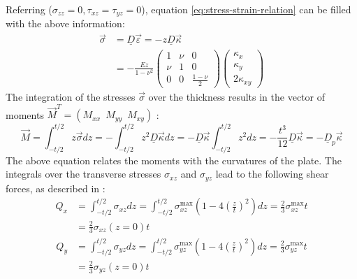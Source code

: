   Referring \cite{klein2013fem} ($\sigma_{zz} = 0, \tau_{xz} = \tau_{yz} = 0$), equation \eqref{eq:stress-strain-relation} can be filled with the above information:
  \begin{align}\label{eq:sigma=-z*D*kappa}
  \vec{\sigma} &= \underline{D} \vec{\varepsilon} = -z \underline{D} \vec{\kappa} \nonumber\\
               &= -\frac{E z}{1-\nu^2} \begin{pmatrix}
               1&\nu&0\\
               \nu&1&0\\
               0&0&\frac{1-\nu}{2}
               \end{pmatrix} \begin{pmatrix}
               \kappa_x\\\kappa_y\\2\kappa_{xy}
               \end{pmatrix}
  \end{align}
  The integration of the stresses $\vec{\sigma}$ over the thickness results in the vector of moments $\vec{M}^T = \left(M_{xx}\ \;M_{yy}\ \;M_{xy}\right)$ \cite{steinke2005finite}:
  \begin{equation}\label{eq:M=-Dp*kappa}
  \vec{M} = \int_{-t/2}^{t/2} z\vec{\sigma} dz = -\int_{-t/2}^{t/2} z^2 \underline{D} \vec{\kappa} dz = -\underline{D} \vec{\kappa} \int_{-t/2}^{t/2} z^2 dz = -\frac{t^3}{12} \underline{D} \vec{\kappa} = -\underline{D}_p \vec{\kappa}
  \end{equation}
  The above equation relates the moments with the curvatures of the plate. The integrals over the transverse stresses $\sigma_{xz}$ and $\sigma_{yz}$ lead to the following shear forces, as described in \cite{steinke2005finite}:
  \begin{align}
  Q_x &= \int_{-t/2}^{t/2}\sigma_{xz} dz = \int_{-t/2}^{t/2} \sigma_{xz}^{\max} \left(1-4\left(\frac{z}{t}\right)^2\right)dz = \frac{2}{3} \sigma_{xz}^{\max} t \nonumber\\
  &= \frac{2}{3} \sigma_{xz}(z=0) t
  \end{align}
  \begin{align}
  Q_y &= \int_{-t/2}^{t/2}\sigma_{yz} dz = \int_{-t/2}^{t/2} \sigma_{yz}^{\max} \left(1-4\left(\frac{z}{t}\right)^2\right)dz = \frac{2}{3} \sigma_{yz}^{\max} t \nonumber\\
  &= \frac{2}{3} \sigma_{yz}(z=0) t
  \end{align}
